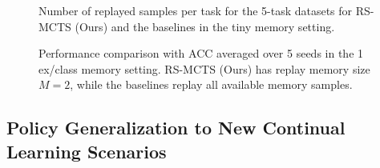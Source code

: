 \begin{figure} %
\begin{minipage}{\textwidth}
	\begin{minipage}[b]{0.34\textwidth}
		\centering
		\setlength{\figwidth}{0.96\textwidth}
		\setlength{\figheight}{.15\textheight}
		
		\vspace{-3mm}
		\caption{Number of replayed samples per task for the 5-task datasets for RS-MCTS (Ours) and the baselines in the tiny memory setting.}
		\label{fig:tiny_memory_experiment_memory_usage}
	\end{minipage}
	\hfill
	\begin{minipage}[b]{0.64\textwidth}
		\centering
		\footnotesize
		\vspace{-3mm}
		\vspace{-3mm}
		\captionsetup{type=table, width=.94\linewidth}
		\caption{Performance comparison with ACC averaged over 5 seeds in the 1 ex/class memory setting. RS-MCTS (Ours) has replay memory size $M=2$, while the baselines replay all available memory samples. }
		\label{tab:efficiency_of_replay_scheduling_5task_datasets}
	\end{minipage}
\end{minipage}
\vspace{-3mm}
\end{figure}



\subsection{Policy Generalization to New Continual Learning Scenarios}

